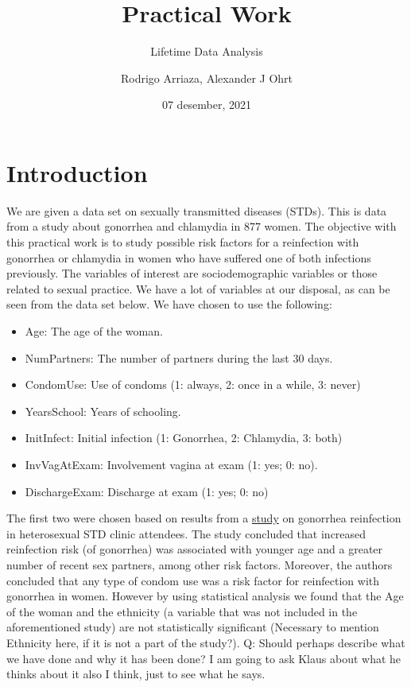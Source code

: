 \documentclass[
]{article}
\title{Practical Work}
\subtitle{Lifetime Data Analysis}
\author{Rodrigo Arriaza, Alexander J Ohrt}
\date{07 desember, 2021}
\providecommand{\tightlist}{%
  \setlength{\itemsep}{0pt}\setlength{\parskip}{0pt}}
\begin{document}
\maketitle

\hypertarget{introduction}{%
\section{Introduction}\label{introduction}}

We are given a data set on sexually transmitted diseases (STDs). This is data from a study about gonorrhea and chlamydia in 877 women. The objective with this practical work is to study possible risk factors for a reinfection with gonorrhea or chlamydia in women who have suffered one of both infections previously. The variables of interest are sociodemographic variables or those related to sexual practice. We have a lot of variables at our disposal, as can be seen from the data set below. We have chosen to use the following:

\begin{itemize}
\tightlist
\item
  Age: The age of the woman.
\item
  NumPartners: The number of partners during the last 30 days.
\item
  CondomUse: Use of condoms (1: always, 2: once in a while, 3: never)
\item
  YearsSchool: Years of schooling.
\item
  InitInfect: Initial infection (1: Gonorrhea, 2: Chlamydia, 3: both)
\item
  InvVagAtExam: Involvement vagina at exam (1: yes; 0: no).
\item
  DischargeExam: Discharge at exam (1: yes; 0: no)
\end{itemize}

The first two were chosen based on results from a \href{https://www.ncbi.nlm.nih.gov/pmc/articles/PMC1744639/}{study} on gonorrhea reinfection in heterosexual STD clinic attendees. The study concluded that increased reinfection risk (of gonorrhea) was associated with younger age and a greater number of recent sex partners, among other risk factors. Moreover, the authors concluded that any type of condom use was a risk factor for reinfection with gonorrhea in women. However by using statistical analysis we found that the Age of the woman and the ethnicity (a variable that was not included in the aforementioned study) are not statistically significant (Necessary to mention Ethnicity here, if it is not a part of the study?). Q: Should perhaps describe what we have done and why it has been done? I am going to ask Klaus about what he thinks about it also I think, just to see what he says.
\end{document}
